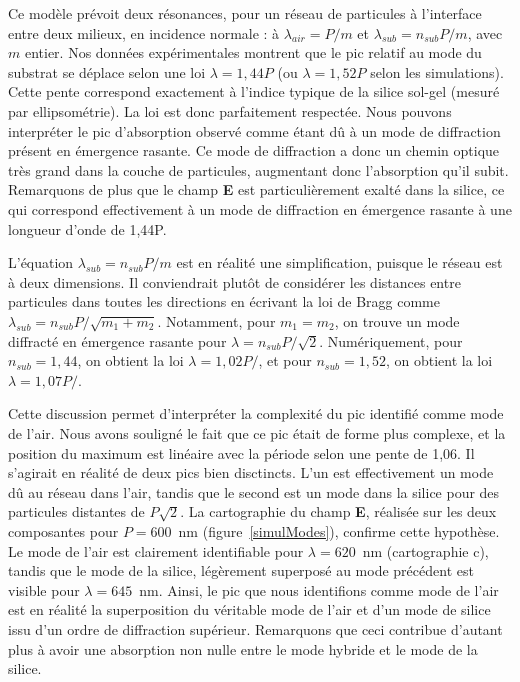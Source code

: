 Ce modèle prévoit deux résonances, pour un réseau de particules à l’interface entre deux milieux, en incidence normale : à $\lambda_{air} = P/m$ et $\lambda_{sub} = n_{sub}P/m$, avec $m$ entier. Nos données expérimentales montrent que le pic relatif au mode du substrat se déplace selon une loi $\lambda = 1,44P $ (ou $\lambda = 1, 52P$ selon les simulations). Cette pente correspond exactement à l'indice typique de la silice sol-gel (mesuré par ellipsométrie). La loi est donc parfaitement respectée. Nous pouvons interpréter le pic d'absorption observé comme étant dû à un mode de diffraction présent en émergence rasante. Ce mode de diffraction a donc un chemin optique très grand dans la couche de particules, augmentant donc l'absorption qu'il subit. Remarquons de plus que le champ \textbf{E} est particulièrement exalté dans la silice, ce qui correspond effectivement à un mode de diffraction en émergence rasante à une longueur d'onde de 1,44P.\par 
L'équation $\lambda_{sub} = n_{sub}P/m$ est en réalité une simplification, puisque le réseau est à deux dimensions. Il conviendrait plutôt de considérer les distances entre particules dans toutes les directions en écrivant la loi de Bragg comme $\lambda_{sub} = n_{sub}P/\sqrt{m_1+m_2}$. Notamment, pour $m_1=m_2$, on trouve un mode diffracté en émergence rasante pour $\lambda = n_{sub}P/\sqrt{2}$. Numériquement, pour $n_{sub}=1,44$, on obtient la loi $\lambda = 1,02 P/$, et pour $n_{sub}=1,52$, on obtient la loi $\lambda = 1,07 P/$.\par 
Cette discussion permet d'interpréter la complexité du pic identifié comme mode de l'air. Nous avons souligné le fait que ce pic était de forme plus complexe, et la position du maximum est linéaire avec la période selon une pente de 1,06. Il s'agirait en réalité de deux pics bien disctincts. L'un est effectivement un mode dû au réseau dans l'air, tandis que le second est un mode dans la silice pour des particules distantes de $P\sqrt{2}$. La cartographie du champ \textbf{E}, réalisée sur les deux composantes pour $P = 600$~nm (figure~\ref{simulModes}), confirme cette hypothèse. Le mode de l'air est clairement identifiable pour $\lambda = 620$~nm (cartographie c), tandis que le mode de la silice, légèrement superposé au mode précédent est visible pour $\lambda = 645$~nm. Ainsi, le pic que nous identifions comme \og mode de l'air \fg{} est en réalité la superposition du véritable mode de l'air et d'un mode de silice issu d'un ordre de diffraction supérieur. Remarquons que ceci contribue d'autant plus à avoir une absorption non nulle entre le mode hybride et le mode de la silice.\par 

